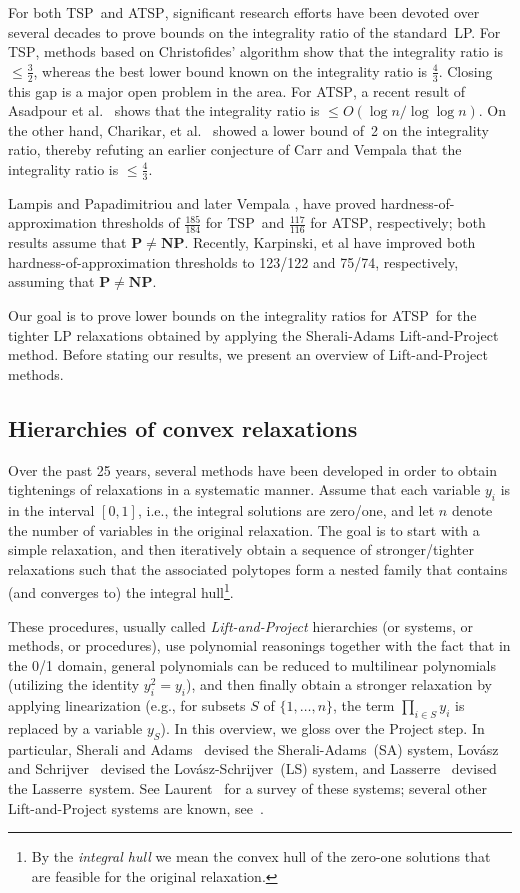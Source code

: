 \documentclass[11pt]{article}
\newcommand{\sa}{\textsf{Sherali-Adams}}
\newcommand{\ls}{\textsf{Lov\'asz-Schrijver}}
\newcommand{\la}{\textsf{Lasserre}}
\newcommand{\iLS}{\textsf{LS}}
\newcommand{\iSA}{\textsf{SA}}
\newcommand{\tsp}{\textsc{TSP}}
\newcommand{\atsp}{\textsc{ATSP}}
\renewcommand{\P}{$\mathbf{P}$}
\newcommand{\NP}{$\mathbf{NP}$}
\begin{document}
For both \tsp\ and \atsp,
significant research efforts have been devoted over several decades
to prove bounds on the integrality ratio of the standard~LP.
For \tsp, methods based on Christofides' algorithm show that
the integrality ratio is $\le\frac32$,
whereas the best lower bound known on the integrality ratio is $\frac43$.
Closing this gap is a major open problem in the area.
For \atsp, a recent result of Asadpour et al.~\cite{AGMOS-soda10}
shows that the integrality ratio is $\le O(\log{n}/\log\log{n})$.
On the other hand, Charikar, et al.~\cite{CGK06} showed a
lower bound of~2 on the integrality ratio,
thereby refuting an earlier conjecture of Carr and Vempala \cite{CV04}
that the integrality ratio is $\leq\frac43$.

Lampis \cite{lampis12} and Papadimitriou and later Vempala
\cite{papad-vempala-06}, have proved
hardness-of-approximation thresholds of $\frac{185}{184}$ for \tsp\ and
$\frac{117}{116}$ for \atsp,  respectively;
both results assume that \P$\not=$\NP.
Recently, Karpinski, et al \cite{KLS-isaac13} have improved both
hardness-of-approximation thresholds to
123/122 and 75/74, respectively, assuming that \P$\not=$\NP.


Our goal is to prove lower bounds on the integrality ratios for \atsp\ 
for the tighter LP relaxations obtained by applying
the Sherali-Adams Lift-and-Project method.
Before stating our results, we present an overview of Lift-and-Project
methods.


\subsection{Hierarchies of convex relaxations}


Over the past 25 years, several methods have been developed in order
to obtain tightenings of relaxations in a systematic manner.
Assume that each variable $y_i$ is in the interval $[0,1]$,
i.e., the integral solutions are zero/one, and
let $n$ denote the number of variables in the original relaxation.
The goal is to start with a simple relaxation,
and then iteratively obtain a sequence of
stronger/tighter relaxations
such that the associated polytopes form a nested family
that contains (and converges to) the integral hull\footnote{
By the \textit{integral hull} we mean
the convex hull of the zero-one solutions
that are feasible for the original relaxation.}.


These procedures, usually called {\em Lift-and-Project}
hierarchies (or systems, or methods, or procedures),
use polynomial reasonings together with
the fact that in the 0/1 domain, general polynomials can be reduced
to multilinear polynomials (utilizing the identity $y_i^2=y_i$), and
then finally obtain a stronger relaxation by applying linearization
(e.g., for subsets $S$ of $\{1,\dots,n\}$,
the term $\prod_{i \in S} y_i$ is replaced by a variable $y_S$).
In this overview, we gloss over the Project step.
In particular,
Sherali and Adams~\cite{SA90} devised the \sa\ (\iSA) system,
Lov\'asz and Schrijver~\cite{LS91}
devised the \ls\ (\iLS) system,
and Lasserre~\cite{las02} devised the \la\ system.
See Laurent~\cite{Lau03} for a survey of these systems;
several other Lift-and-Project systems are known,
see~\cite{CM-chapter,AT-ipco11}.
\end{document}
